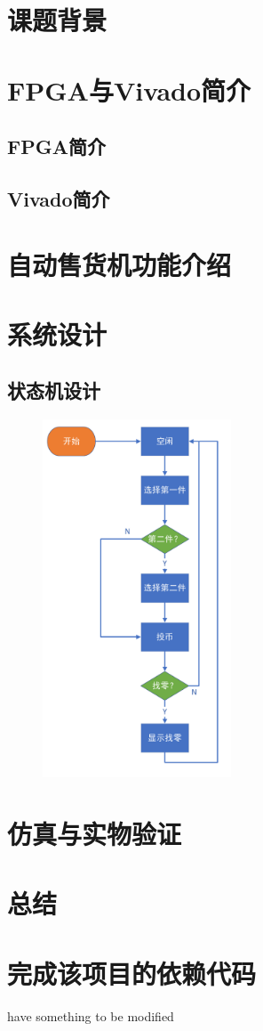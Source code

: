 \documentclass[12pt]{SEU-Circuit-Report}
\begin{document}
    \exptitlepage
    \section{课题背景}
    \section{FPGA与Vivado简介}
    \subsection{FPGA简介}
    \subsection{Vivado简介}
    \section{自动售货机功能介绍}
    \section{系统设计}
    \subsection{状态机设计}
    \begin{figure}[htbp]
        \centering
        \includegraphics[width=0.5\textwidth]{fig/flowchart.pdf}
    \end{figure}
    \section{仿真与实物验证}
    \section{总结}
    \appendix
    \section{完成该项目的依赖代码}
    have something to be modified
\end{document}
